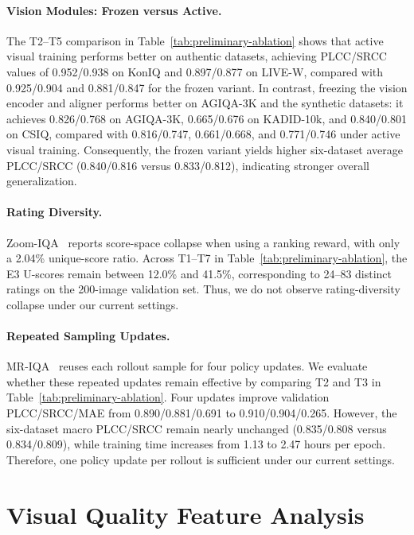 \paragraph{Vision Modules: Frozen versus Active.}
The T2--T5 comparison in Table~\ref{tab:preliminary-ablation} shows that active
visual training performs better on authentic datasets, achieving
PLCC/SRCC values of 0.952/0.938 on KonIQ and 0.897/0.877 on LIVE-W, compared
with 0.925/0.904 and 0.881/0.847 for the frozen variant. In contrast, freezing
the vision encoder and aligner performs better on AGIQA-3K and the synthetic
datasets: it achieves 0.826/0.768 on AGIQA-3K, 0.665/0.676 on KADID-10k, and
0.840/0.801 on CSIQ, compared with 0.816/0.747, 0.661/0.668, and 0.771/0.746
under active visual training. Consequently, the frozen variant yields higher
six-dataset average PLCC/SRCC (0.840/0.816 versus 0.833/0.812), indicating
stronger overall generalization.

\paragraph{Rating Diversity.}
Zoom-IQA~\citep{zoom-iqa} reports score-space collapse when using a ranking
reward, with only a 2.04\% unique-score ratio. Across T1--T7 in
Table~\ref{tab:preliminary-ablation}, the E3 U-scores remain between 12.0\% and
41.5\%, corresponding to 24--83 distinct ratings on the 200-image validation
set. Thus, we do not observe rating-diversity collapse under our current
settings.

\paragraph{Repeated Sampling Updates.}
MR-IQA~\citep{mr-iqa} reuses each rollout sample for four policy updates. We
evaluate whether these repeated updates remain effective by comparing T2 and
T3 in Table~\ref{tab:preliminary-ablation}. Four updates improve validation
PLCC/SRCC/MAE from 0.890/0.881/0.691 to
0.910/0.904/0.265. However, the six-dataset macro PLCC/SRCC remain nearly
unchanged (0.835/0.808 versus 0.834/0.809), while training time increases from
1.13 to 2.47 hours per epoch. Therefore, one policy update per rollout is
sufficient under our current settings.

\section{Visual Quality Feature Analysis}
\label{app:visual-quality-feature-analysis}

